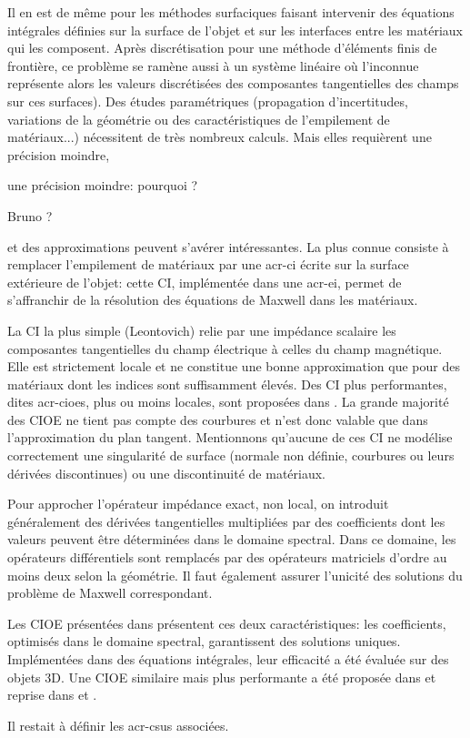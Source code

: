 Il en est de même pour les méthodes surfaciques faisant intervenir des équations intégrales définies sur la surface de l'objet et sur les interfaces entre les matériaux qui les composent. 
Après discrétisation pour une méthode d’éléments finis de frontière, ce problème se ramène aussi à un système linéaire où l'inconnue représente alors les valeurs discrétisées des composantes tangentielles des champs sur ces surfaces).
Des études paramétriques (propagation d’incertitudes, variations de la géométrie ou des caractéristiques de l'empilement de matériaux...) nécessitent de très nombreux calculs.
Mais elles requièrent une précision moindre,
\begin{REM}
	une précision moindre: pourquoi ?
\end{REM}
\begin{REP}
	Bruno ?
\end{REP}
et des approximations peuvent s'avérer intéressantes.
La plus connue consiste à remplacer l'empilement de matériaux par une \gls{acr-ci} écrite sur la surface extérieure de l'objet: cette CI, implémentée dans une \gls{acr-ei}, permet de s’affranchir de la résolution des équations de Maxwell dans les matériaux.

La CI la plus simple (Leontovich) relie par une impédance scalaire les composantes tangentielles du champ électrique à celles du champ magnétique.
Elle est strictement locale et ne constitue une bonne approximation que pour des matériaux dont les indices sont suffisamment élevés.
Des CI plus performantes, dites \glspl{acr-cioe}, plus ou moins locales, sont proposées dans \cite{hoppe_impedance_1995,stupfel_implementation_2015}.
La grande majorité des CIOE ne tient pas compte des courbures et n’est donc valable que dans l'approximation du plan tangent.
Mentionnons qu'aucune de ces CI ne modélise correctement une singularité de surface (normale non définie, courbures ou leurs dérivées discontinues) ou une discontinuité de matériaux.

Pour approcher l’opérateur impédance exact, non local, on introduit généralement des dérivées tangentielles multipliées par des coefficients dont les valeurs peuvent être déterminées dans le domaine spectral. Dans ce domaine, les opérateurs différentiels sont remplacés par des opérateurs matriciels d'ordre au moins deux selon la géométrie.
Il faut également assurer l’unicité des solutions du problème de Maxwell correspondant.

Les CIOE présentées dans \cite{stupfel_sufficient_2011,stupfel_implementation_2015} présentent ces deux caractéristiques: les coefficients, optimisés dans le domaine spectral, garantissent des solutions uniques.
Implémentées dans des équations intégrales, leur efficacité a été évaluée sur des objets 3D.
Une CIOE similaire mais plus performante a été proposée dans \cite{marceaux_high-order_2000} et reprise dans \cite{aubakirov_electromagnetic_2014} et \cite{soudais_3d_2017}.

Il restait à définir les \glspl{acr-csu} associées.

